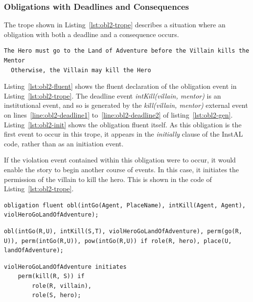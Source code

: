 \documentclass[11pt]{report}
\begin{document}
\subsubsection{Obligations with Deadlines and Consequences}
The trope shown in Listing~\ref{lst:obl2-trope} describes a situation where an
obligation with both a deadline and a consequence occurs.

\begin{lstlisting}[showstringspaces=false,label={lst:obl2-trope}, caption={Example of a trope
containing an obligation with both a deadline and a consequence}]
The Hero must go to the Land of Adventure before the Villain kills the Mentor
  Otherwise, the Villain may kill the Hero
\end{lstlisting}

Listing~\ref{lst:obl2-fluent} shows the fluent declaration of the obligation
event in Listing~\ref{lst:obl2-trope}. The deadline event \emph{intKill(villain,
  mentor)} is an institutional event, and so is generated by the
\emph{kill(villain, mentor)} external event on
lines~\ref{line:obl2-deadline1} to~\ref{line:obl2-deadline2} of
listing~\ref{lst:obl2-gen}. Listing~\ref{lst:obl2-init} shows the obligation
fluent itself. As this obligation is the first event to occur in this trope,
it appears in the \emph{initially} clause of the InstAL code, rather than as an
initiation event.

If the violation event contained within this obligation were to occur, it would
enable the story to begin another course of events. In this case, it initiates
the permission of the villain to kill the hero. This is shown in the code of Listing~\ref{lst:obl2-trope}.

\begin{lstlisting}[label={lst:obl2-fluent}, caption={Fluent declaration for an
obligation fluent with both deadline and consequence events}]
obligation fluent obl(intGo(Agent, PlaceName), intKill(Agent, Agent), violHeroGoLandOfAdventure);
\end{lstlisting}

\begin{lstlisting}[label={lst:obl2-init}, caption={An obligation fluent with
both a deadline and a consequence, translated from the trope in Listing~\ref{lst:obl2-trope}}]
obl(intGo(R,U), intKill(S,T), violHeroGoLandOfAdventure), perm(go(R, U)), perm(intGo(R,U)), pow(intGo(R,U)) if role(R, hero), place(U, landOfAdventure);
\end{lstlisting}

\begin{lstlisting}[label={lst:obl2-viol}, caption={Permissions generated by the
violation event of the trope in Listing~\ref{lst:obl2-trope}}]
violHeroGoLandOfAdventure initiates
    perm(kill(R, S)) if
        role(R, villain),
        role(S, hero);
\end{lstlisting}
\end{document}
